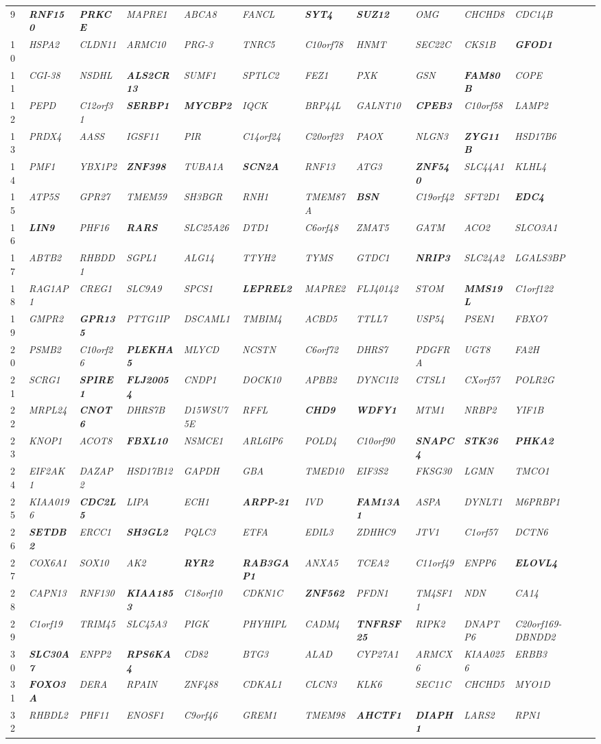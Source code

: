 \documentclass[letterpaper,12pt]{article}
\numberwithin{equation}{appendix}
\begin{document}
\begin{landscape}
{{\begin{longtable}{l >{\itshape}l >{\itshape}l >{\itshape}l >{\itshape}l >{\itshape}l >{\itshape}l >{\itshape}l >{\itshape}l >{\itshape}l >{\itshape}l}
9&{\bfseries {RNF150}}&{\bfseries {PRKCE}}&MAPRE1&ABCA8&FANCL&{\bfseries {SYT4}}&{\bfseries {SUZ12}}&OMG&CHCHD8&CDC14B\tabularnewline
10&HSPA2&CLDN11&ARMC10&PRG-3&TNRC5&C10orf78&HNMT&SEC22C&CKS1B&{\bfseries {GFOD1}}\tabularnewline
11&CGI-38&NSDHL&{\bfseries {ALS2CR13}}&SUMF1&SPTLC2&FEZ1&PXK&GSN&{\bfseries {FAM80B}}&COPE\tabularnewline
12&PEPD&C12orf31&{\bfseries {SERBP1}}&{\bfseries {MYCBP2}}&IQCK&BRP44L&GALNT10&{\bfseries {CPEB3}}&C10orf58&LAMP2\tabularnewline
13&PRDX4&AASS&IGSF11&PIR&C14orf24&C20orf23&PAOX&NLGN3&{\bfseries {ZYG11B}}&HSD17B6\tabularnewline
14&PMF1&YBX1P2&{\bfseries {ZNF398}}&TUBA1A&{\bfseries {SCN2A}}&RNF13&ATG3&{\bfseries {ZNF540}}&SLC44A1&KLHL4\tabularnewline
15&ATP5S&GPR27&TMEM59&SH3BGR&RNH1&TMEM87A&{\bfseries {BSN}}&C19orf42&SFT2D1&{\bfseries {EDC4}}\tabularnewline
16&{\bfseries {LIN9}}&PHF16&{\bfseries {RARS}}&SLC25A26&DTD1&C6orf48&ZMAT5&GATM&ACO2&SLCO3A1\tabularnewline
17&ABTB2&RHBDD1&SGPL1&ALG14&TTYH2&TYMS&GTDC1&{\bfseries {NRIP3}}&SLC24A2&LGALS3BP\tabularnewline
18&RAG1AP1&CREG1&SLC9A9&SPCS1&{\bfseries {LEPREL2}}&MAPRE2&FLJ40142&STOM&{\bfseries {MMS19L}}&C1orf122\tabularnewline
19&GMPR2&{\bfseries {GPR135}}&PTTG1IP&DSCAML1&TMBIM4&ACBD5&TTLL7&USP54&PSEN1&FBXO7\tabularnewline
20&PSMB2&C10orf26&{\bfseries {PLEKHA5}}&MLYCD&NCSTN&C6orf72&DHRS7&PDGFRA&UGT8&FA2H\tabularnewline
21&SCRG1&{\bfseries {SPIRE1}}&{\bfseries {FLJ20054}}&CNDP1&DOCK10&APBB2&DYNC1I2&CTSL1&CXorf57&POLR2G\tabularnewline
22&MRPL24&{\bfseries {CNOT6}}&DHRS7B&D15WSU75E&RFFL&{\bfseries {CHD9}}&{\bfseries {WDFY1}}&MTM1&NRBP2&YIF1B\tabularnewline
23&KNOP1&ACOT8&{\bfseries {FBXL10}}&NSMCE1&ARL6IP6&POLD4&C10orf90&{\bfseries {SNAPC4}}&{\bfseries {STK36}}&{\bfseries {PHKA2}}\tabularnewline
24&EIF2AK1&DAZAP2&HSD17B12&GAPDH&GBA&TMED10&EIF3S2&FKSG30&LGMN&TMCO1\tabularnewline
25&KIAA0196&{\bfseries {CDC2L5}}&LIPA&ECH1&{\bfseries {ARPP-21}}&IVD&{\bfseries {FAM13A1}}&ASPA&DYNLT1&M6PRBP1\tabularnewline
26&{\bfseries {SETDB2}}&ERCC1&{\bfseries {SH3GL2}}&PQLC3&ETFA&EDIL3&ZDHHC9&JTV1&C1orf57&DCTN6\tabularnewline
27&COX6A1&SOX10&AK2&{\bfseries {RYR2}}&{\bfseries {RAB3GAP1}}&ANXA5&TCEA2&C11orf49&ENPP6&{\bfseries {ELOVL4}}\tabularnewline
28&CAPN13&RNF130&{\bfseries {KIAA1853}}&C18orf10&CDKN1C&{\bfseries {ZNF562}}&PFDN1&TM4SF11&NDN&CA14\tabularnewline
29&C1orf19&TRIM45&SLC45A3&PIGK&PHYHIPL&CADM4&{\bfseries {TNFRSF25}}&RIPK2&DNAPTP6&C20orf169-DBNDD2\tabularnewline
30&{\bfseries {SLC30A7}}&ENPP2&{\bfseries {RPS6KA4}}&CD82&BTG3&ALAD&CYP27A1&ARMCX6&KIAA0256&ERBB3\tabularnewline
31&{\bfseries {FOXO3A}}&DERA&RPAIN&ZNF488&CDKAL1&CLCN3&KLK6&SEC11C&CHCHD5&MYO1D\tabularnewline
32&RHBDL2&PHF11&ENOSF1&C9orf46&GREM1&TMEM98&{\bfseries {AHCTF1}}&{\bfseries {DIAPH1}}&LARS2&RPN1\tabularnewline

\end{longtable}}}
\end{landscape}
\end{document}
